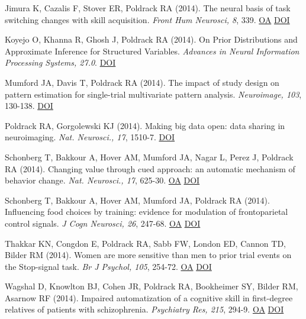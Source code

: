Jimura K, Cazalis F, Stover ER, Poldrack RA (2014). The neural basis of task switching changes with skill acquisition. \textit{Front Hum Neurosci, 8}, 339. \href{https://www.ncbi.nlm.nih.gov/pmc/articles/PMC4033195}{OA} \href{http://dx.doi.org/10.3389/fnhum.2014.00339}{DOI} \vspace{2mm}

Koyejo O, Khanna R, Ghosh J, Poldrack RA (2014). On Prior Distributions and Approximate Inference for Structured Variables. \textit{Advances in Neural Information Processing Systems, 27.0}. \href{http://dx.doi.org/zndnlplo}{DOI} \vspace{2mm}

Mumford JA, Davis T, Poldrack RA (2014). The impact of study design on pattern estimation for single-trial multivariate pattern analysis. \textit{Neuroimage, 103}, 130-138. \href{http://dx.doi.org/10.1016/j.neuroimage.2014.09.026}{DOI} \vspace{2mm}

Poldrack RA, Gorgolewski KJ (2014). Making big data open: data sharing in neuroimaging. \textit{Nat. Neurosci., 17}, 1510-7. \href{http://dx.doi.org/10.1038/nn.3818}{DOI} \vspace{2mm}

Schonberg T, Bakkour A, Hover AM, Mumford JA, Nagar L, Perez J, Poldrack RA (2014). Changing value through cued approach: an automatic mechanism of behavior change. \textit{Nat. Neurosci., 17}, 625-30. \href{https://www.ncbi.nlm.nih.gov/pmc/articles/PMC4041518}{OA} \href{http://dx.doi.org/10.1038/nn.3673}{DOI} \vspace{2mm}

Schonberg T, Bakkour A, Hover AM, Mumford JA, Poldrack RA (2014). Influencing food choices by training: evidence for modulation of frontoparietal control signals. \textit{J Cogn Neurosci, 26}, 247-68. \href{https://www.ncbi.nlm.nih.gov/pmc/articles/PMC4066661}{OA} \href{http://dx.doi.org/10.1162/jocn\_a\_00495}{DOI} \vspace{2mm}

Thakkar KN, Congdon E, Poldrack RA, Sabb FW, London ED, Cannon TD, Bilder RM (2014). Women are more sensitive than men to prior trial events on the Stop-signal task. \textit{Br J Psychol, 105}, 254-72. \href{https://www.ncbi.nlm.nih.gov/pmc/articles/PMC4000536}{OA} \href{http://dx.doi.org/10.1111/bjop.12034}{DOI} \vspace{2mm}

Wagshal D, Knowlton BJ, Cohen JR, Poldrack RA, Bookheimer SY, Bilder RM, Asarnow RF (2014). Impaired automatization of a cognitive skill in first-degree relatives of patients with schizophrenia. \textit{Psychiatry Res, 215}, 294-9. \href{https://www.ncbi.nlm.nih.gov/pmc/articles/PMC4191851}{OA} \href{http://dx.doi.org/10.1016/j.psychres.2013.11.024}{DOI} \vspace{2mm}

